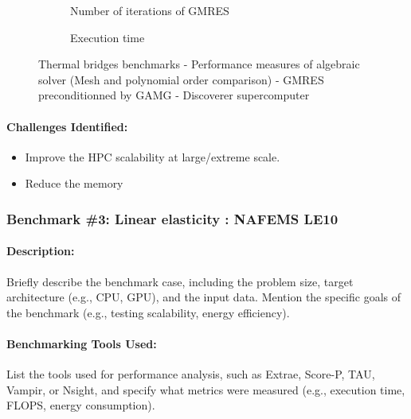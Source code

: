 \begin{figure}
  \begin{subfigure}[c]{\textwidth}
    \centering
    \caption{Number of iterations of GMRES}
  \end{subfigure}
  \begin{subfigure}[c]{\textwidth}
    \centering
    \caption{Execution time}
  \end{subfigure}
  \caption{Thermal bridges benchmarks - Performance measures of algebraic solver
    (Mesh and polynomial order comparison) - GMRES preconditionned by GAMG - Discoverer supercomputer}
  \label{fig:feelpp:wp3:thermal_bridges:performance_measure_all}
\end{figure}


\paragraph{Challenges Identified:} %

\begin{itemize}
\item Improve the HPC scalability at large/extreme scale.
\item Reduce the memory
\end{itemize}

\subsubsection{Benchmark \#3: Linear elasticity : NAFEMS LE10}
\label{sec:WP3:Feelpp:benchmark:nafems-le10}

\paragraph{Description:} Briefly describe the benchmark case, including the problem size, target architecture (e.g., CPU, GPU), and the input data. Mention the specific goals of the benchmark (e.g., testing scalability, energy efficiency).

\paragraph{Benchmarking Tools Used:} List the tools used for performance analysis, such as Extrae, Score-P, TAU, Vampir, or Nsight, and specify what metrics were measured (e.g., execution time, FLOPS, energy consumption).

